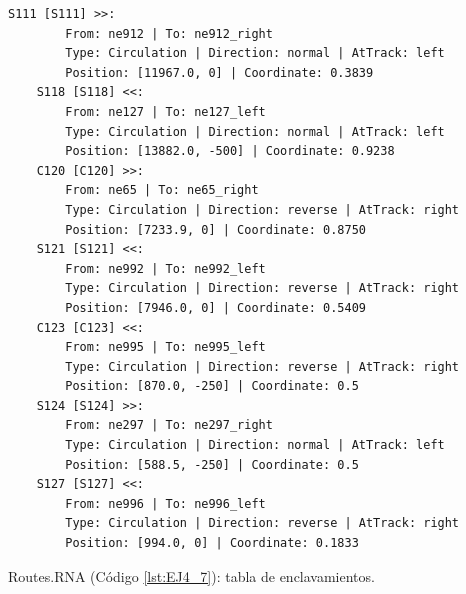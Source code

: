 \begin{lstlisting}[language = {}, tabsize=4, basicstyle=\footnotesize\ttfamily, showspaces=false, showstringspaces=false, caption = Signalling.RNA, label = {lst:EJ4_6}]
	S111 [S111] >>:
		From: ne912 | To: ne912_right
		Type: Circulation | Direction: normal | AtTrack: left 
		Position: [11967.0, 0] | Coordinate: 0.3839
	S118 [S118] <<:
		From: ne127 | To: ne127_left
		Type: Circulation | Direction: normal | AtTrack: left 
		Position: [13882.0, -500] | Coordinate: 0.9238
	C120 [C120] >>:
		From: ne65 | To: ne65_right
		Type: Circulation | Direction: reverse | AtTrack: right 
		Position: [7233.9, 0] | Coordinate: 0.8750
	S121 [S121] <<:
		From: ne992 | To: ne992_left
		Type: Circulation | Direction: reverse | AtTrack: right 
		Position: [7946.0, 0] | Coordinate: 0.5409
	C123 [C123] <<:
		From: ne995 | To: ne995_left
		Type: Circulation | Direction: reverse | AtTrack: right 
		Position: [870.0, -250] | Coordinate: 0.5
	S124 [S124] >>:
		From: ne297 | To: ne297_right
		Type: Circulation | Direction: normal | AtTrack: left 
		Position: [588.5, -250] | Coordinate: 0.5
	S127 [S127] <<:
		From: ne996 | To: ne996_left
		Type: Circulation | Direction: reverse | AtTrack: right 
		Position: [994.0, 0] | Coordinate: 0.1833
\end{lstlisting}

Routes.RNA (Código \ref{lst:EJ4_7}): tabla de enclavamientos.

